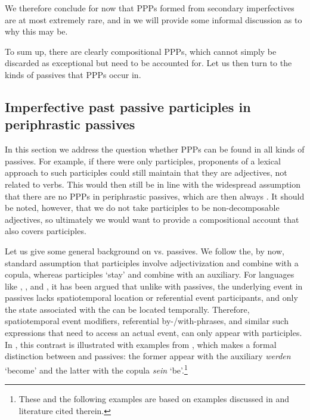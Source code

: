 \documentclass[output=paper,modfonts,newtxmath,hidelinks
\ChapterDOI{10.5281/zenodo.2545513}
]{langscibook}
\begin{document}
\noindent We therefore conclude for now that PPPs formed from secondary imperfectives are at most extremely rare, and in  we will provide some informal discussion as to why this may be. 

To sum up, there are clearly compositional  PPPs, which cannot simply be discarded as exceptional but need to be accounted for. Let us then turn to the kinds of passives that  PPPs occur in.

\subsection{Imperfective past passive participles in periphrastic passives} 
\label{passive}

In this section we address the question whether  PPPs can be found in all kinds of passives. For example, if there were only  participles, proponents of a lexical approach to such participles could still maintain that they are adjectives, not related to  verbs. This would then still be in line with the widespread assumption that there are no  PPPs in periphrastic passives, which are then always . It should be noted, however, that we do not take  participles to be non-decomposable adjectives, so ultimately we would want to provide a compositional account that also covers  participles.

Let us give some general background on  vs.  passives. We follow the, by now, standard assumption that  participles involve adjectivization and combine with a copula, whereas  participles `stay'  and combine with an auxiliary. For languages like , , and , it has been argued \citep[see][and literature cited therein]{gehrkesub15, gehrkenllt, gehrkemarcolingua, alexiadou+lingua} that unlike with  passives, the underlying event in  passives lacks spatiotemporal location or referential event participants, and only the state associated with the   can be located temporally. Therefore, spatiotemporal event modifiers, referential by-/with-phrases, and similar such expressions that need to access an actual event, can only appear with  participles. In , this contrast is illustrated with examples from , which makes a formal distinction between  and  passives: the former appear with the auxiliary \textit{werden} `become' and the latter with the copula \textit{sein} `be'.\footnote{These and the following  examples are based on examples discussed in \citet{gehrkenllt} and literature cited therein.}
\end{document}
